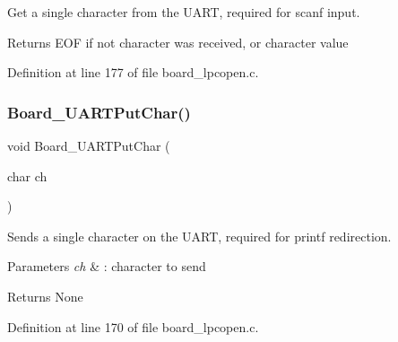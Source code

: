 Get a single character from the U\+A\+RT, required for scanf input. 

\begin{DoxyReturn}{Returns}
E\+OF if not character was received, or character value 
\end{DoxyReturn}


Definition at line 177 of file board\+\_\+lpcopen.\+c.

\mbox{\label{group___b_o_a_r_d___c_o_m_m_o_n___a_p_i_gada2a79f4fcd7cd730317fc34291bf08e}} 
\subsubsection{\texorpdfstring{Board\+\_\+\+U\+A\+R\+T\+Put\+Char()}{Board\_UARTPutChar()}}
{\footnotesize\ttfamily void Board\+\_\+\+U\+A\+R\+T\+Put\+Char (\begin{DoxyParamCaption}\item[{char}]{ch }\end{DoxyParamCaption})}



Sends a single character on the U\+A\+RT, required for printf redirection. 


\begin{DoxyParams}{Parameters}
{\em ch} & \+: character to send \\
\hline
\end{DoxyParams}
\begin{DoxyReturn}{Returns}
None 
\end{DoxyReturn}


Definition at line 170 of file board\+\_\+lpcopen.\+c.

\mbox{\label{group___b_o_a_r_d___c_o_m_m_o_n___a_p_i_gadaf1c6682fad416564e3113b628bb327}} 
